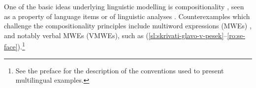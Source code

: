 \documentclass[output=paper,
modfonts,
]{langscibook}
\begin{document}
One of the basic ideas underlying linguistic modelling is compositionality \citep{Baggioetal12}, seen as a property of language items \citep{Janssen01,Parteeetal90} or of linguistic analyses \citep{Kracht07}. 
Counterexamples which challenge the compositionality principles \citep{PaginWesterstahl10b} include multiword expressions (MWEs) \citep{Sag2002a,Kim:2008}%
, and notably 
verbal MWEs (VMWEs), such as (\ref{sl:skrivati-glavo-v-pesek}--\ref{ro:se-face}).\footnote{See the preface for the description of the conventions used to present multilingual examples.}
\end{document}
